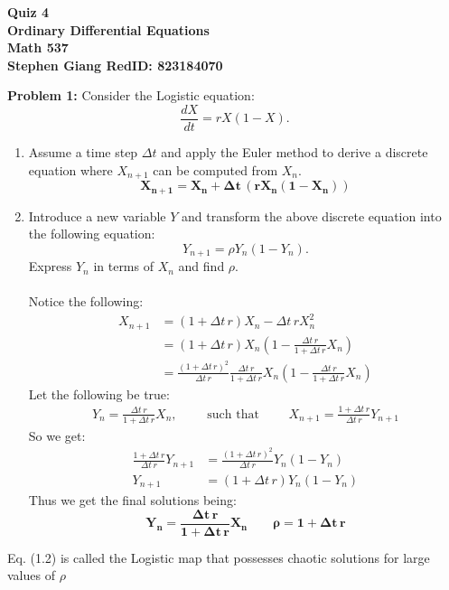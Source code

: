 \documentclass[11pt]{article}
\newcommand{\skipline}{\vspace{\baselineskip}}
\newenvironment{problem}[1]{\textbf{Problem #1: }}{\newpage}
\begin{document}
	
	\begin{center}
		\textbf{Quiz 4} \\
		\textbf{Ordinary Differential Equations} \\
		\textbf{Math 537} \\
		\textbf{Stephen Giang RedID: 823184070} \\
		\skipline \skipline
	\end{center}

	\begin{problem}{1}
		Consider the Logistic equation:
		\[\frac{dX}{dt} = rX(1 - X). \tag{1.1}\]
		\begin{enumerate}[label = (\alph*)]
			\item Assume a time step $\Delta t$ and apply the Euler method to derive a discrete equation where $X_{n+1}$ can be computed from $X_n$.
			\[\boldsymbol{X_{n+1} = X_n + \Delta t \, \left(rX_n(1-X_n)\right)}\]
			\item Introduce a new variable $Y$ and transform the above discrete equation into the following equation:
			\[Y_{n+1} = \rho Y_n(1 - Y_n). \tag{1.2}\]
			Express $Y_n$ in terms of $X_n$ and find $\rho$.
			\\ \\
			Notice the following:
			\begin{align*}
				X_{n+1} &= (1 + \Delta t \,r) X_n - \Delta t \,r X_n^2 \\
				&= (1 + \Delta t \,r) X_n \left(1 - \frac{\Delta t\,r}{1 + \Delta t \,r}X_n\right) \\
				&= \frac{(1 + \Delta t \,r)^2}{\Delta t \,r} \frac{\Delta t\,r}{1 + \Delta t \,r}X_n \left(1 - \frac{\Delta t\,r}{1 + \Delta t \,r}X_n\right) 
			\end{align*}
			Let the following be true:
			\begin{align*}
				Y_n = \frac{\Delta t\,r}{1 + \Delta t \,r}X_n, \qquad \text{ such that } \qquad X_{n+1} = \frac{1 + \Delta t \,r}{\Delta t\,r}Y_{n+1}
			\end{align*}
			So we get:
			\begin{align*}
				\frac{1 + \Delta t \,r}{\Delta t\,r}Y_{n+1} &= \frac{(1 + \Delta t \,r)^2}{\Delta t \,r}Y_n \left(1 - Y_n\right) \\
				Y_{n+1} &= (1 + \Delta t\,r)Y_n(1 - Y_n)
			\end{align*}
			Thus we get the final solutions being:
			\[\boldsymbol{Y_n = \frac{\Delta t\,r}{1 + \Delta t \,r}X_n \qquad \rho = 1 + \Delta t\,r}\]
		\end{enumerate}
		Eq. (1.2) is called the Logistic map that possesses chaotic solutions for large values of $\rho$
	\end{problem}
\end{document}
